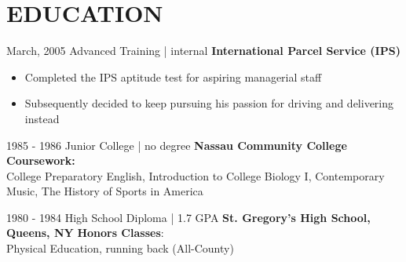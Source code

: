 \documentclass[]{friggeri-cv_reccius-experiment}
\begin{document}
\section{EDUCATION}
\begin{entrylist}
 
   \entry
    {March, 2005\enspace}
    {Advanced Training | }{\small{internal}}
    {\normalsize\textbf{\color{ipsgreen}\faMapMarker\space International Parcel Service (IPS)}}
    {\jobspace
    \begin{itemize}[leftmargin=*, itemsep = 0.1em]
    \item Completed the IPS aptitude test for aspiring managerial staff
    \item Subsequently decided to keep pursuing his passion for driving and delivering instead\\
    \end{itemize}}
    
  \entry
    {1985 - 1986\enspace}
    {Junior College | }{\small{no degree}}
    {\normalsize\textbf{\color{ipsgreen}\faMapMarker\space Nassau Community College}}
    {\textbf{Coursework:} \\College Preparatory English, Introduction to College Biology I, Contemporary Music, The History of Sports in America
    \eduspace\\}

  \entry
    {1980 - 1984\enspace}
    {High School Diploma | } {\Large\diameter\thinspace\normalsize 1.7 GPA}
    {\normalsize\textbf{\color{ipsgreen}\faMapMarker\space St. Gregory's High School, Queens, NY}
    }
    {\textbf{Honors Classes}: \\Physical Education, running back (All-County)}\vspace{-2.8mm}
\end{entrylist}
\end{document}
